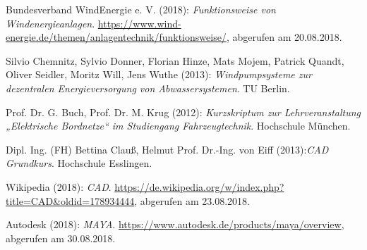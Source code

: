 
\begin{thebibliography}{999}
\label{WindEnergie}
Bundesverband WindEnergie e. V.  (2018): \textit{Funktionsweise von Windenergieanlagen}.\newline
\url{https://www.wind-energie.de/themen/anlagentechnik/funktionsweise/},\newline 
abgerufen am 20.08.2018.

\label{Windpumpsysteme}
Silvio Chemnitz, Sylvio Donner, Florian Hinze, Mats Mojem, Patrick Quandt, Oliver Seidler, Moritz Will, Jens Wuthe (2013): \textit{Windpumpsysteme zur dezentralen Energieversorgung von Abwassersystemen}. TU Berlin.

\label{Bordnetze}
Prof. Dr. G. Buch, Prof. Dr. M. Krug (2012): \textit{Kurzskriptum zur Lehrveranstaltung „Elektrische Bordnetze“ im Studiengang Fahrzeugtechnik}. Hochschule München.

\label{CAD}
Dipl. Ing. (FH) Bettina Clauß, Helmut Prof. Dr.-Ing. von Eiff (2013):\textit{CAD Grundkurs}. Hochschule Esslingen.

\label{WikiCAD}
Wikipedia  (2018): \textit{CAD}.\newline
\url{https://de.wikipedia.org/w/index.php?title=CAD&oldid=178934444},\newline 
abgerufen am 23.08.2018.

\label{Maya}
Autodesk  (2018): \textit{MAYA}.\newline
\url{https://www.autodesk.de/products/maya/overview},\newline 
abgerufen am 30.08.2018.

\end{thebibliography}
